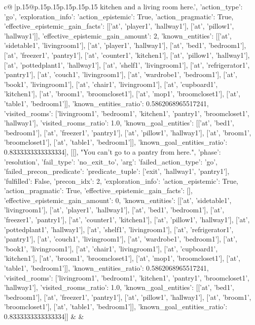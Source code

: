 \documentclass{article}
\begin{document}
{\begin{supertabular}{c@{$\;$}|p{.15\linewidth}@{}p{.15\linewidth}p{.15\linewidth}p{.15\linewidth}p{.15\linewidth}p{.15\linewidth}}
{{{kitchen and a living room here.', {'action_type': 'go', 'exploration_info': {'action_epistemic': True, 'action_pragmatic': True, 'effective_epistemic_gain_facts': [['at', 'player1', 'hallway1'], ['at', 'pillow1', 'hallway1']], 'effective_epistemic_gain_amount': 2, 'known_entities': [['at', 'sidetable1', 'livingroom1'], ['at', 'player1', 'hallway1'], ['at', 'bed1', 'bedroom1'], ['at', 'freezer1', 'pantry1'], ['at', 'counter1', 'kitchen1'], ['at', 'pillow1', 'hallway1'], ['at', 'pottedplant1', 'hallway1'], ['at', 'shelf1', 'livingroom1'], ['at', 'refrigerator1', 'pantry1'], ['at', 'couch1', 'livingroom1'], ['at', 'wardrobe1', 'bedroom1'], ['at', 'book1', 'livingroom1'], ['at', 'chair1', 'livingroom1'], ['at', 'cupboard1', 'kitchen1'], ['at', 'broom1', 'broomcloset1'], ['at', 'mop1', 'broomcloset1'], ['at', 'table1', 'bedroom1']], 'known_entities_ratio': 0.5862068965517241, 'visited_rooms': ['livingroom1', 'bedroom1', 'kitchen1', 'pantry1', 'broomcloset1', 'hallway1'], 'visited_rooms_ratio': 1.0, 'known_goal_entities': [['at', 'bed1', 'bedroom1'], ['at', 'freezer1', 'pantry1'], ['at', 'pillow1', 'hallway1'], ['at', 'broom1', 'broomcloset1'], ['at', 'table1', 'bedroom1']], 'known_goal_entities_ratio': 0.8333333333333334}}], [[], "You can't go to a pantry from here.", {'phase': 'resolution', 'fail_type': 'no_exit_to', 'arg': {'failed_action_type': 'go', 'failed_precon_predicate': {'predicate_tuple': ['exit', 'hallway1', 'pantry1'], 'fulfilled': False, 'precon_idx': 2}}, 'exploration_info': {'action_epistemic': True, 'action_pragmatic': True, 'effective_epistemic_gain_facts': [], 'effective_epistemic_gain_amount': 0, 'known_entities': [['at', 'sidetable1', 'livingroom1'], ['at', 'player1', 'hallway1'], ['at', 'bed1', 'bedroom1'], ['at', 'freezer1', 'pantry1'], ['at', 'counter1', 'kitchen1'], ['at', 'pillow1', 'hallway1'], ['at', 'pottedplant1', 'hallway1'], ['at', 'shelf1', 'livingroom1'], ['at', 'refrigerator1', 'pantry1'], ['at', 'couch1', 'livingroom1'], ['at', 'wardrobe1', 'bedroom1'], ['at', 'book1', 'livingroom1'], ['at', 'chair1', 'livingroom1'], ['at', 'cupboard1', 'kitchen1'], ['at', 'broom1', 'broomcloset1'], ['at', 'mop1', 'broomcloset1'], ['at', 'table1', 'bedroom1']], 'known_entities_ratio': 0.5862068965517241, 'visited_rooms': ['livingroom1', 'bedroom1', 'kitchen1', 'pantry1', 'broomcloset1', 'hallway1'], 'visited_rooms_ratio': 1.0, 'known_goal_entities': [['at', 'bed1', 'bedroom1'], ['at', 'freezer1', 'pantry1'], ['at', 'pillow1', 'hallway1'], ['at', 'broom1', 'broomcloset1'], ['at', 'table1', 'bedroom1']], 'known_goal_entities_ratio': 0.8333333333333334}}]] 
	  } 
	   } 
	   } 
	 & & \\ 
 


\end{supertabular}}
\end{document}
